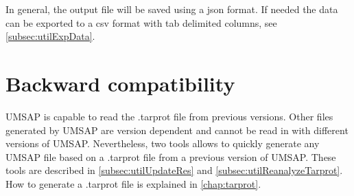 In general, the output file will be saved using a json format. If needed the data can be exported to a csv format with tab delimited columns, see \autoref{subsec:utilExpData}. 

\section{Backward compatibility}
\label{sec:backwardCompatibility}

UMSAP is capable to read the .tarprot file from previous versions. Other files generated by UMSAP are version dependent and cannot be read in with different versions of UMSAP. Nevertheless, two tools allows to quickly generate any UMSAP file based on a .tarprot file from a previous version of UMSAP. These tools are described in \autoref{subsec:utilUpdateRes} and \autoref{subsec:utilReanalyzeTarprot}. How to generate a .tarprot file is explained in \autoref{chap:tarprot}.
